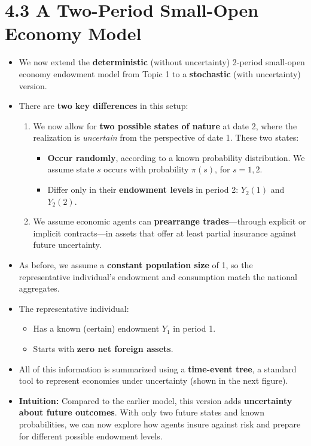 \documentclass[12pt]{article}
\begin{document}
\section*{\noindent\textbf{4.3 A Two-Period Small-Open Economy Model}}

\begin{itemize}
\item We now extend the \textbf{deterministic} (without uncertainty) 2-period small-open economy endowment model from Topic 1 to a \textbf{stochastic} (with uncertainty) version.

\item There are \textbf{two key differences} in this setup:
  \begin{enumerate}
    \item We now allow for \textbf{two possible states of nature} at date 2, where the realization is \textit{uncertain} from the perspective of date 1. These two states:
    \begin{itemize}
      \item \textbf{Occur randomly}, according to a known probability distribution. We assume state $s$ occurs with probability $\pi(s)$, for $s = 1, 2$.
      \item Differ only in their \textbf{endowment levels} in period 2: $Y_2(1)$ and $Y_2(2)$.
    \end{itemize}

    \item We assume economic agents can \textbf{prearrange trades}—through explicit or implicit contracts—in assets that offer at least partial insurance against future uncertainty.
  \end{enumerate}

\item As before, we assume a \textbf{constant population size} of 1, so the representative individual’s endowment and consumption match the national aggregates.

\item The representative individual:
  \begin{itemize}
    \item Has a known (certain) endowment $Y_1$ in period 1.
    \item Starts with \textbf{zero net foreign assets}.
  \end{itemize}

\item All of this information is summarized using a \textbf{time-event tree}, a standard tool to represent economies under uncertainty (shown in the next figure).

\item \textbf{Intuition:} Compared to the earlier model, this version adds \textbf{uncertainty about future outcomes}. With only two future states and known probabilities, we can now explore how agents insure against risk and prepare for different possible endowment levels.
\end{itemize}
\end{document}

